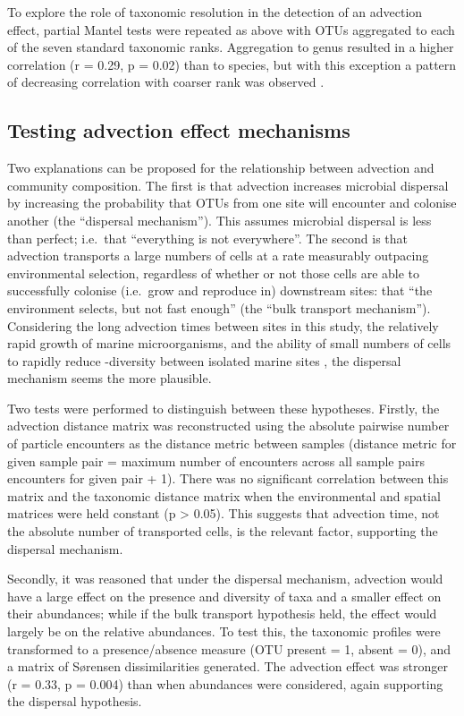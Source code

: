To explore the role of taxonomic resolution in the detection of an advection effect, partial Mantel tests were repeated as above with \acp{OTU} aggregated to each of the seven standard taxonomic ranks.
Aggregation to genus resulted in a higher correlation (r = 0.29, p = 0.02) than to species, but with this exception a pattern of decreasing correlation with coarser rank was observed .



\subsection{Testing advection effect mechanisms}

Two explanations can be proposed for the relationship between advection and community composition.
The first is that advection increases microbial dispersal by increasing the probability that \acp{OTU} from one site will encounter and colonise another (the ``dispersal mechanism'').
This assumes microbial dispersal is less than perfect; i.e.\ that ``everything is not everywhere''.
The second is that advection transports a large numbers of cells at a rate measurably outpacing environmental selection, regardless of whether or not those cells are able to successfully colonise (i.e.\ grow and reproduce in) downstream sites: that ``the environment selects, but not fast enough'' (the ``bulk transport mechanism'').
Considering the long advection times between sites in this study, the relatively rapid growth of marine microorganisms, and the ability of small numbers of cells to rapidly reduce \textbeta{}-diversity between isolated marine sites \cite{Declerck:2013cz}, the dispersal mechanism seems the more plausible.

Two tests were performed to distinguish between these hypotheses.
Firstly, the advection distance matrix was reconstructed using the absolute pairwise number of particle encounters as the distance metric between samples (distance metric for given sample pair = maximum number of encounters across all sample pairs \textminus{} encounters for given pair + 1).
There was no significant correlation between this matrix and the taxonomic distance matrix when the environmental and spatial matrices were held constant (p \textgreater{} 0.05).
This suggests that advection time, not the absolute number of transported cells, is the relevant factor, supporting the dispersal mechanism.

Secondly, it was reasoned that under the dispersal mechanism, advection would have a large effect on the presence and diversity of taxa and a smaller effect on their abundances; while if the bulk transport hypothesis held, the effect would largely be on the relative abundances.
To test this, the taxonomic profiles were transformed to a presence/absence measure (\ac{OTU} present = 1, absent = 0), and a matrix of S\o{}rensen dissimilarities generated.
The advection effect was stronger (r = 0.33, p = 0.004) than when abundances were considered, again supporting the dispersal hypothesis. 

